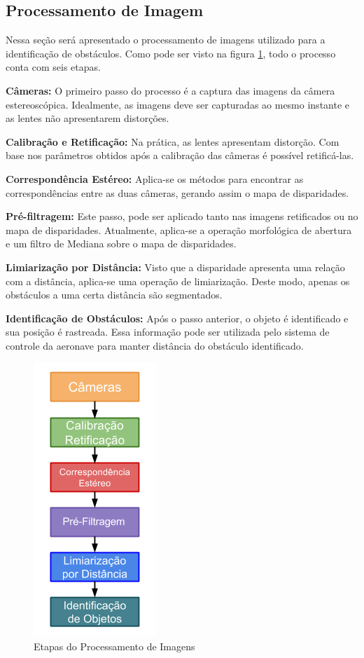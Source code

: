 \subsection{Processamento de Imagem}

Nessa seção será apresentado o processamento de imagens utilizado para a identificação de obstáculos. Como pode ser visto na figura \ref{stereo_processor_steps}, todo o processo conta com seis etapas.

\textbf{Câmeras:} O primeiro passo do processo é a captura das imagens da câmera estereoscópica. Idealmente, as imagens deve ser capturadas ao mesmo instante e as lentes não apresentarem distorções.   

\textbf{Calibração e Retificação:} Na prática, as lentes apresentam distorção. Com base nos parâmetros obtidos após a calibração das câmeras é possível retificá-las. 

\textbf{Correspondência Estéreo:} Aplica-se os métodos para encontrar as correspondências entre as duas câmeras, gerando assim o mapa de disparidades.

\textbf{Pré-filtragem:} Este passo, pode ser aplicado tanto nas imagens retificados ou no mapa de disparidades. Atualmente, aplica-se a operação morfológica de abertura e um filtro de Mediana sobre o mapa de disparidades. 

\textbf{Limiarização por Distância:} Visto que a disparidade apresenta uma relação com a distância, aplica-se uma operação de limiarização. Deste modo, apenas os obstáculos a uma certa distância são segmentados.

\textbf{Identificação de Obstáculos:} Após o passo anterior, o objeto é identificado e sua posição é rastreada. Essa informação pode ser utilizada pelo sistema de controle da aeronave para manter distância do obstáculo identificado.

\begin{figure}[H]
	\centering
	\includegraphics[scale=0.50]{./Resources/stereo_processor_steps.png}
	\caption{Etapas do Processamento de Imagens}
	\label{stereo_processor_steps}
\end{figure}



